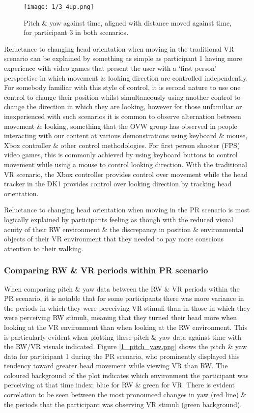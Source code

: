 \begin{figure}
	\begin{center}
	\texttt{[image: 1/3\_4up.png]}
	\caption{Pitch \& yaw against time, aligned with distance moved against time, for participant 3 in both scenarios.}
	\label{3_4up.png}
	\end{center}
\end{figure}

Reluctance to changing head orientation when moving in the traditional VR scenario can be explained by something as simple as participant 1 having more experience with video games that present the user with a `first person' perspective in which movement \& looking direction are controlled independently. For somebody familiar with this style of control, it is second nature to use one control to change their position whilst simultaneously using another control to change the direction in which they are looking, however for those unfamiliar or inexperienced with such scenarios it is common to observe alternation between movement \& looking, something that the OVW group has observed in people interacting with our content at various demonstrations using keyboard \& mouse, Xbox controller \& other control methodologies. For first person shooter (FPS) video games, this is commonly achieved by using keyboard buttons to control movement while using a mouse to control looking direction. With the traditional VR scenario, the Xbox controller provides control over movement while the head tracker in the DK1 provides control over looking direction by tracking head orientation.

Reluctance to changing head orientation when moving in the PR scenario is most logically explained by participants feeling as though with the reduced visual acuity of their RW environment \& the discrepancy in position \& environmental objects of their VR environment that they needed to pay more conscious attention to their walking.

\subsubsection{Comparing RW \& VR periods within PR scenario}

When comparing pitch \& yaw data between the RW \& VR periods within the PR scenario, it is notable that for some participants there was more variance in the periods in which they were perceiving VR stimuli than in those in which they were perceiving RW stimuli, meaning that they turned their head more when looking at the VR environment than when looking at the RW environment. This is particularly evident when plotting these pitch \& yaw data against time with the RW/VR visuals indicated. Figure \ref{1_pitch_yaw.png} shows the pitch \& yaw data for participant 1 during the PR scenario, who prominently displayed this tendency toward greater head movement while viewing VR than RW. The coloured background of the plot indicates which environment the participant was perceiving at that time index; blue for RW \& green for VR. There is evident correlation to be seen between the most pronounced changes in yaw (red line) \& the periods that the participant was observing VR stimuli (green background).

